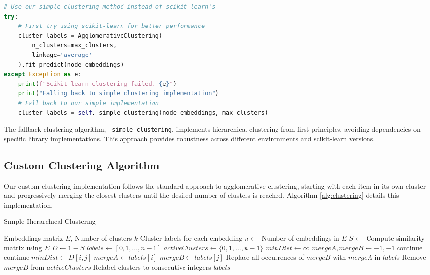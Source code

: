 \documentclass[conference]{IEEEtran}
\begin{document}
\begin{lstlisting}[language=Python]
# Use our simple clustering method instead of scikit-learn's
try:
    # First try using scikit-learn for better performance
    cluster_labels = AgglomerativeClustering(
        n_clusters=max_clusters, 
        linkage='average'
    ).fit_predict(node_embeddings)
except Exception as e:
    print(f"Scikit-learn clustering failed: {e}")
    print("Falling back to simple clustering implementation")
    # Fall back to our simple implementation
    cluster_labels = self._simple_clustering(node_embeddings, max_clusters)
\end{lstlisting}

The fallback clustering algorithm, \texttt{\_simple\_clustering}, implements hierarchical clustering from first principles, avoiding dependencies on specific library implementations. This approach provides robustness across different environments and scikit-learn versions.

\subsection{Custom Clustering Algorithm}

Our custom clustering implementation follows the standard approach to agglomerative clustering, starting with each item in its own cluster and progressively merging the closest clusters until the desired number of clusters is reached. Algorithm \ref{alg:clustering} details this implementation.

\begin{algorithm}
\caption{Simple Hierarchical Clustering}
\label{alg:clustering}
\begin{algorithmic}[1]
\REQUIRE Embeddings matrix $E$, Number of clusters $k$
\ENSURE Cluster labels for each embedding
\STATE $n \gets$ Number of embeddings in $E$
\STATE $S \gets$ Compute similarity matrix using $E$
\STATE $D \gets 1 - S$ 
\STATE $labels \gets [0, 1, ..., n-1]$ 
\STATE $activeClusters \gets \{0, 1, ..., n-1\}$
    \STATE $minDist \gets \infty$
    \STATE $mergeA, mergeB \gets -1, -1$
            \STATE continue
        \ENDIF
                \STATE continue
            \ENDIF
                \STATE $minDist \gets D[i,j]$
                \STATE $mergeA \gets labels[i]$
                \STATE $mergeB \gets labels[j]$
            \ENDIF
        \ENDFOR
    \ENDFOR
        \STATE Replace all occurrences of $mergeB$ with $mergeA$ in $labels$
        \STATE Remove $mergeB$ from $activeClusters$
    \ENDIF
\ENDWHILE
\STATE Relabel clusters to consecutive integers
\RETURN $labels$
\end{algorithmic}
\end{algorithm}
\end{document}
